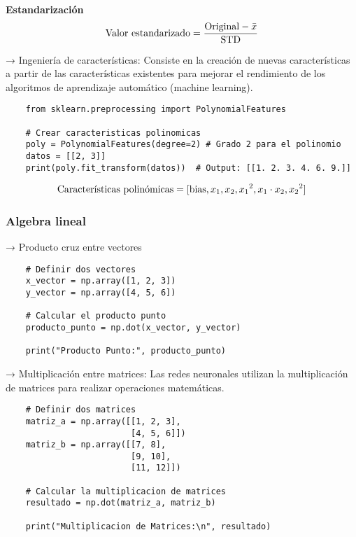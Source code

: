 \documentclass{templateNote}
\begin{document}
\begin{center}
    \textbf{Estandarización}
    \begin{equation*}
        \textnormal{Valor estandarizado} = \frac{\textnormal{Original} - \bar{x}}{\textnormal{STD}} 
    \end{equation*}
\end{center}
 
\noindent → Ingeniería de características: Consiste en la creación de nuevas características a partir de las características existentes para mejorar el rendimiento de los algoritmos de aprendizaje automático (machine learning).
\begin{lstlisting}
    from sklearn.preprocessing import PolynomialFeatures

    # Crear caracteristicas polinomicas
    poly = PolynomialFeatures(degree=2) # Grado 2 para el polinomio
    datos = [[2, 3]]
    print(poly.fit_transform(datos))  # Output: [[1. 2. 3. 4. 6. 9.]]
\end{lstlisting}
\begin{align*}
    \textnormal{Características polinómicas} = [\textnormal{bias}, x_1, x_2, {x_1}^2, x_1 \cdot x_2, {x_2}^2]
\end{align*}

\subsubsection*{Algebra lineal}

\noindent → Producto cruz entre vectores
\begin{lstlisting}
    # Definir dos vectores
    x_vector = np.array([1, 2, 3])
    y_vector = np.array([4, 5, 6])
    
    # Calcular el producto punto
    producto_punto = np.dot(x_vector, y_vector)
    
    print("Producto Punto:", producto_punto)
\end{lstlisting}

\noindent → Multiplicación entre matrices: Las redes neuronales utilizan la multiplicación de matrices para realizar operaciones matemáticas.
\begin{lstlisting}
    # Definir dos matrices
    matriz_a = np.array([[1, 2, 3],
                         [4, 5, 6]])
    matriz_b = np.array([[7, 8],
                         [9, 10],
                         [11, 12]])
    
    # Calcular la multiplicacion de matrices
    resultado = np.dot(matriz_a, matriz_b)
    
    print("Multiplicacion de Matrices:\n", resultado)
\end{lstlisting}
\end{document}
